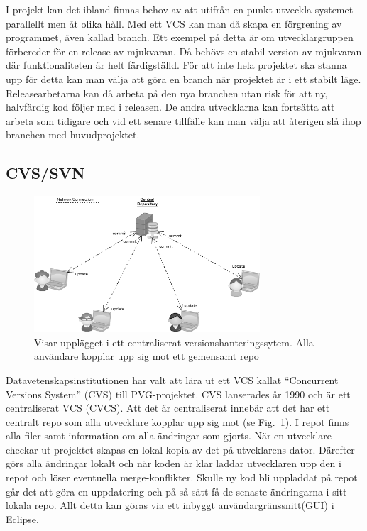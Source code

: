 I projekt kan det ibland finnas behov av att utifrån en punkt utveckla systemet parallellt men åt olika håll. Med ett VCS kan man då skapa en förgrening av programmet, även kallad branch. Ett exempel på detta är om utvecklargruppen förbereder för en release av mjukvaran. Då behövs en stabil version av mjukvaran där funktionaliteten är helt färdigställd. För att inte hela projektet ska stanna upp för detta kan man välja att göra en branch när projektet är i ett stabilt läge. Releasearbetarna kan då arbeta på den nya branchen utan risk för att ny, halvfärdig kod följer med i releasen. De andra utvecklarna kan fortsätta att arbeta som tidigare och vid ett senare tillfälle kan man välja att återigen slå ihop branchen med huvudprojektet.


\subsection{CVS/SVN}

\begin{figure}[htb!]\centering\includegraphics[width=0.75\textwidth]{CVCS.png}\caption{Visar upplägget i ett centraliserat versionshanteringssytem. Alla användare kopplar upp sig mot ett gemensamt repo}\label{fig:CVCSPic}\end{figure}



Datavetenskapsinstitutionen har valt att lära ut ett VCS kallat “Concurrent Versions System” (CVS) till PVG-projektet. CVS lanserades år 1990 och är ett centraliserat VCS (CVCS). Att det är centraliserat innebär att det har ett centralt repo som alla utvecklare kopplar upp sig mot (se Fig.~\ref{fig:CVCSPic}). I repot finns alla filer samt information om alla ändringar som gjorts. När en utvecklare checkar ut projektet skapas en lokal kopia av det på utveklarens dator. Därefter görs alla ändringar lokalt och när koden är klar laddar utvecklaren upp den i repot och löser eventuella merge-konflikter. Skulle ny kod bli uppladdat på repot går det att göra en uppdatering och på så sätt få de senaste ändringarna i sitt lokala repo. Allt detta kan göras via ett inbyggt användargränssnitt(GUI) i Eclipse. 

